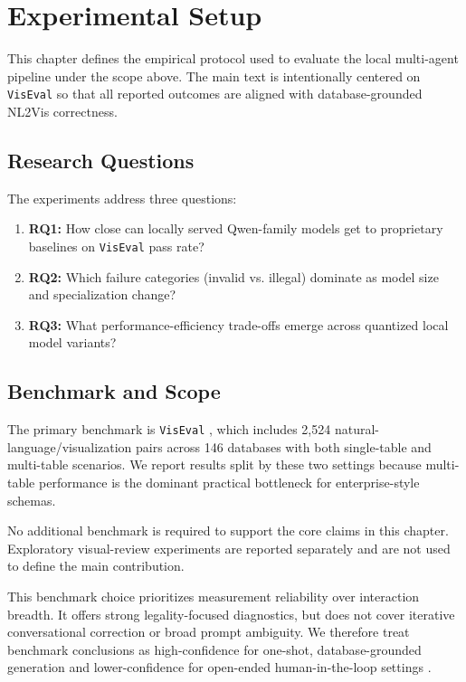 \documentclass[a4paper,oneside,bibliography=totoc]{scrbook}
\begin{document}
\chapter{Experimental Setup}

This chapter defines the empirical protocol used to evaluate the local multi-agent pipeline under the scope above. The main text is intentionally centered on \texttt{VisEval} so that all reported outcomes are aligned with database-grounded NL2Vis correctness.

\section{Research Questions}

The experiments address three questions:
\begin{enumerate}
  \item \textbf{RQ1:} How close can locally served Qwen-family models get to proprietary baselines on \texttt{VisEval} pass rate?
  \item \textbf{RQ2:} Which failure categories (invalid vs.
illegal) dominate as model size and specialization change?
  \item \textbf{RQ3:} What performance-efficiency trade-offs emerge across quantized local model variants?
\end{enumerate}

\section{Benchmark and Scope}
\label{sec:exp_benchmarks}

The primary benchmark is \texttt{VisEval} \cite{chen2025viseval}, which includes 2{,}524 natural-language/visualization pairs across 146 databases with both single-table and multi-table scenarios. We report results split by these two settings because multi-table performance is the dominant practical bottleneck for enterprise-style schemas.

No additional benchmark is required to support the core claims in this chapter. Exploratory visual-review experiments are reported separately and are not used to define the main contribution.

This benchmark choice prioritizes measurement reliability over interaction breadth. It offers strong legality-focused diagnostics, but does not cover iterative conversational correction or broad prompt ambiguity. We therefore treat benchmark conclusions as high-confidence for one-shot, database-grounded generation and lower-confidence for open-ended human-in-the-loop settings \cite{chen2025viseval,nguyen2024bench}.
\end{document}
